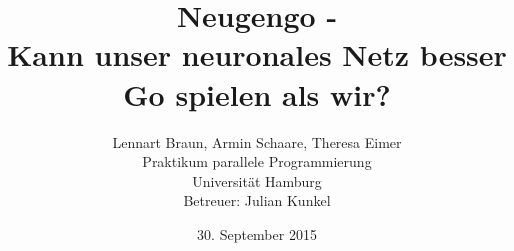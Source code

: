 \documentclass[12pt,a4paper]{article}
\author{Lennart Braun, Armin Schaare, Theresa Eimer 
		\\ Praktikum parallele Programmierung
		\\ Universität Hamburg
		\\ Betreuer: Julian Kunkel}
\title{Neugengo - \\ Kann unser neuronales Netz besser Go spielen als wir?}
\date{30. September 2015}
\begin{document}
\maketitle

\renewcommand{\contentsname}{Inhalt}
\tableofcontents

\newpage








\end{document}
